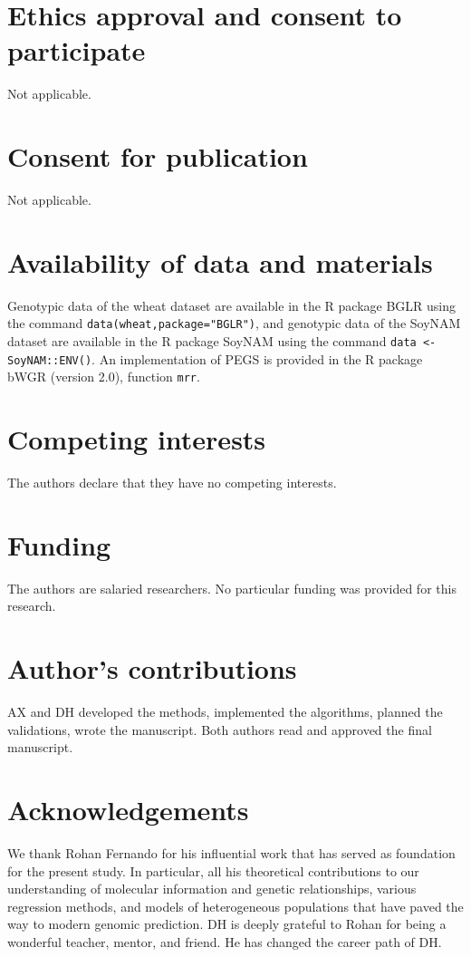 \documentclass{bmcart}
\begin{document}
\begin{backmatter}

\section*{Ethics approval and consent to participate}
Not applicable.

\section*{Consent for publication}
Not applicable.

\section*{Availability of data and materials}
Genotypic data of the wheat dataset are available in the R package BGLR using the command \verb|data(wheat,package="BGLR")|, and genotypic data of the SoyNAM dataset are available in the R package SoyNAM using the command \verb|data <- SoyNAM::ENV()|. An implementation of PEGS is provided in the R package bWGR (version 2.0), function \verb|mrr|.

\section*{Competing interests}
The authors declare that they have no competing interests.

\section*{Funding}
The authors are salaried researchers. No particular funding was provided for this research. 

\section*{Author's contributions}
AX and DH developed the methods, implemented the algorithms, planned the validations, wrote the manuscript. Both authors read and approved the final manuscript.

\section*{Acknowledgements}

We thank Rohan Fernando for his influential work that has served as foundation for the present study. In particular, all his theoretical contributions to our understanding of molecular information and genetic relationships, various regression methods, and models of heterogeneous populations that have paved the way to modern genomic prediction. DH is deeply grateful to Rohan for being a wonderful teacher, mentor, and friend. He has changed the career path of DH.


\end{backmatter}
\end{document}
